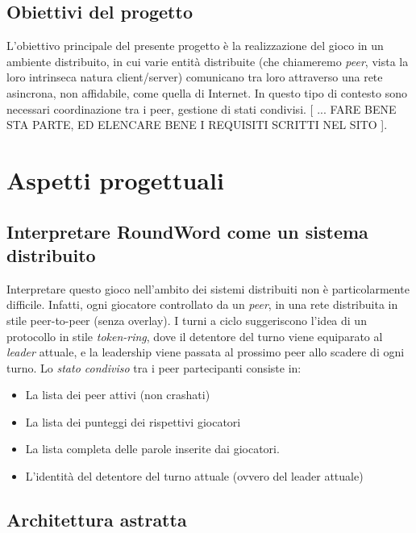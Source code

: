 \documentclass[10.5pt]{article}
\begin{document}
\subsection{Obiettivi del progetto}

L'obiettivo principale del presente progetto è la realizzazione del gioco in un ambiente distribuito, in cui varie entità distribuite (che chiameremo \emph{peer}, vista la loro intrinseca natura client/server) comunicano tra loro attraverso una rete asincrona, non affidabile, come quella di Internet. In questo tipo di contesto sono necessari coordinazione tra i peer, gestione di stati condivisi. [ ... FARE BENE STA PARTE, ED ELENCARE BENE I REQUISITI SCRITTI NEL SITO ].




\section{Aspetti progettuali}

\subsection{Interpretare RoundWord come un sistema distribuito}
Interpretare questo gioco nell'ambito dei sistemi distribuiti non è particolarmente difficile. Infatti, ogni giocatore controllato da un \emph{peer}, in una rete distribuita in stile peer-to-peer (senza overlay). I turni a ciclo suggeriscono l'idea di un protocollo in stile \emph{token-ring}, dove il detentore del turno viene equiparato al \emph{leader} attuale, e la leadership viene passata al prossimo peer allo scadere di ogni turno. Lo \emph{stato condiviso} tra i peer partecipanti consiste in:
\begin{itemize}
\item La lista dei peer attivi (non crashati)
\item La lista dei punteggi dei rispettivi giocatori
\item La lista completa delle parole inserite dai giocatori.
\item L'identità del detentore del turno attuale (ovvero del leader attuale)
\end{itemize}


\subsection{Architettura astratta}
\end{document}
